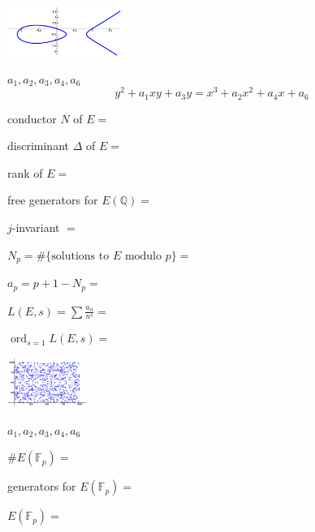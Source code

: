 \documentclass[a4paper]{article}
\newcommand{\FF}{\mathbb{F}}
\newcommand{\QQ}{\mathbb{Q}}
\begin{document}
\begin{multicols*}{3}
{\tiny{}}
\BreakLineAndIndent
\includegraphics[width=10em]{ec.eps}

\mbox{}\quad\EX{E = EllipticCurve([}$a_1,a_2,a_3,a_4,a_6$\EX{])}
\vspace{-1ex}
$$y^2 + a_1 xy + a_3 y = x^3 + a_2 x^2 + a_4 x + a_6$$

conductor $N$ of $E = $

discriminant $\Delta$ of $E = $

rank of $E =$  

free generators for $E(\QQ) = $ 

$j$-invariant $=$ 

$N_p = \#\{\text{solutions to $E$ modulo $p$}\} = $ \EX{)}

$a_p = p+1 - N_p = $\EX{)}

$L(E,s) = \sum \frac{a_n}{n^s} = $ 

$\operatorname{ord}_{s=1}L(E,s) = $ 



{\tiny{}}

\mbox{}\qquad\qquad\includegraphics[width=7em]{ecmodp.eps}

\mbox{}\quad\EX{E = EllipticCurve(GF(p), [}$a_1,a_2,a_3,a_4,a_6$\EX{])}

$\#E(\FF_p) = $ 

generators for $E(\FF_p) = $ 

$E(\FF_p) = $

















\end{multicols*}
\end{document}
